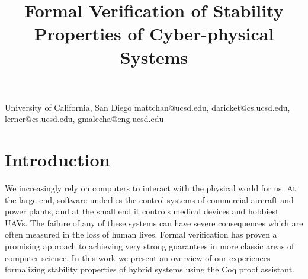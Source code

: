 \documentclass[preprint,nocopyrightspace]{sigplanconf}
\begin{document}
\setlength{\pdfpageheight}{\paperheight}
\setlength{\pdfpagewidth}{\paperwidth}





\titlebanner{}        %
\preprintfooter{}   %

\title{Formal Verification of Stability Properties of Cyber-physical Systems}

           {University of California, San Diego}
           {mattchan@ucsd.edu, daricket@cs.ucsd.edu, lerner@cs.ucsd.edu, gmalecha@eng.ucsd.edu}

\maketitle





\section{Introduction}          %

We increasingly rely on computers to interact with the physical world for us.
At the large end, software underlies the control systems of commercial aircraft and power plants, and at the small end it controls medical devices and hobbiest UAVs.
The failure of any of these systems can have severe consequences which are often measured in the loss of human lives.
Formal verification has proven a promising approach to achieving very strong guarantees in more classic areas of computer science.
In this work we present an overview of our experiences formalizing stability properties of hybrid systems using the Coq proof assistant.
\end{document}
